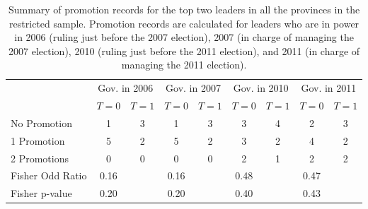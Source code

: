 \begin{table}[ht]
\centering
\caption{Summary of promotion records for the top two leaders in all the provinces in the restricted sample. 
             Promotion records are calculated for leaders who are in power in 2006 (ruling just before the 2007 election), 2007 (in charge of managing the 2007 election),
             2010 (ruling just before the 2011 election), and 2011 (in charge of managing the 2011 election).} 
\label{tab:promo_mech}
\begin{tabular}{lcccccccc}
   & \multicolumn{2}{c}{Gov. in 2006} & \multicolumn{2}{c}{Gov. in 2007} & \multicolumn{2}{c}{Gov. in 2010} & \multicolumn{2}{c}{Gov. in 2011} \\
 & $T = 0$ & $T = 1$ & $T = 0$ & $T = 1$ & $T = 0$ & $T = 1$ & $T = 0$ & $T = 1$ \\
 \hline
No Promotion & 1 & 3 & 1 & 3 & 3 & 4 & 2 & 3 \\ 
  1 Promotion & 5 & 2 & 5 & 2 & 3 & 2 & 4 & 2 \\ 
  2 Promotions & 0 & 0 & 0 & 0 & 2 & 1 & 2 & 2 \\ 
   \hline
Fisher Odd Ratio & 0.16 &  & 0.16 &  & 0.48 &  & 0.47 &  \\ 
  Fisher p-value & 0.20 &  & 0.20 &  & 0.40 &  & 0.43 &  \\ 
  \end{tabular}
\end{table}
